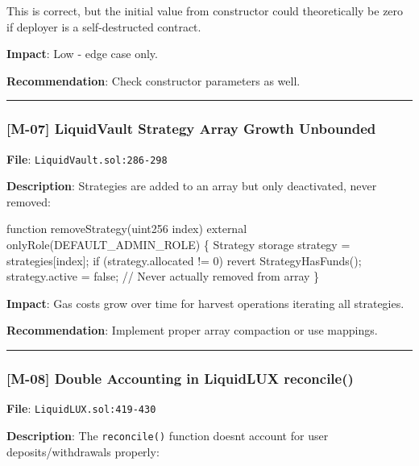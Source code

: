 \documentclass[
]{article}
\newenvironment{Shaded}{}{}
\newcommand{\NormalTok}[1]{#1}
\begin{document}
This is correct, but the initial value from constructor could
theoretically be zero if deployer is a self-destructed contract.

\textbf{Impact}: Low - edge case only.

\textbf{Recommendation}: Check constructor parameters as well.

\begin{center}\rule{0.5\linewidth}{0.5pt}\end{center}

\subsubsection{{[}M-07{]} LiquidVault Strategy Array Growth
Unbounded}\label{m-07-liquidvault-strategy-array-growth-unbounded}

\textbf{File}: \texttt{LiquidVault.sol:286-298}

\textbf{Description}: Strategies are added to an array but only
deactivated, never removed:

\begin{Shaded}
\begin{Highlighting}[]
\NormalTok{function removeStrategy(uint256 index) external onlyRole(DEFAULT\_ADMIN\_ROLE) \{}
\NormalTok{    Strategy storage strategy = strategies[index];}
\NormalTok{    if (strategy.allocated != 0) revert StrategyHasFunds();}
\NormalTok{    strategy.active = false;  // Never actually removed from array}
\NormalTok{\}}
\end{Highlighting}
\end{Shaded}

\textbf{Impact}: Gas costs grow over time for harvest operations
iterating all strategies.

\textbf{Recommendation}: Implement proper array compaction or use
mappings.

\begin{center}\rule{0.5\linewidth}{0.5pt}\end{center}

\subsubsection{{[}M-08{]} Double Accounting in LiquidLUX
reconcile()}\label{m-08-double-accounting-in-liquidlux-reconcile}

\textbf{File}: \texttt{LiquidLUX.sol:419-430}

\textbf{Description}: The \texttt{reconcile()} function
doesn\textquotesingle t account for user deposits/withdrawals properly:
\end{document}
